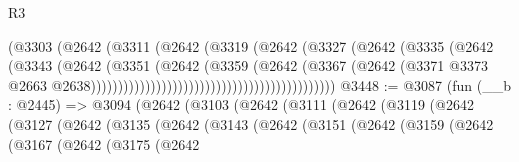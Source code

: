 \begin{lexlean}{R3}
\begin{coremodule}
                                                        (@3303
                                                          (@2642
                                                            (@3311
                                                              (@2642
                                                                (@3319
                                                                  (@2642
                                                                    (@3327
                                                                      (@2642
                                                                        (@3335
                                                                          (@2642
                                                                            (@3343
                                                                              (@2642
                                                                                (@3351
                                                                                  (@2642
                                                                                    (@3359
                                                                                      (@2642
                                                                                        (@3367
                                                                                          (@2642
                                                                                            (@3371
                                                                                              @3373
                                                                                              @2663
                                                                                              @2638)))))))))))))))))))))))))))))))))))))))))))))
@3448 := @3087
    (fun (__b : @2445) =>
    @3094
      (@2642
        (@3103
          (@2642
            (@3111
              (@2642
                (@3119
                  (@2642
                    (@3127
                      (@2642
                        (@3135
                          (@2642
                            (@3143
                              (@2642
                                (@3151
                                  (@2642
                                    (@3159
                                      (@2642
                                        (@3167
                                          (@2642
                                            (@3175
                                              (@2642

\end{coremodule}
\end{lexlean}
